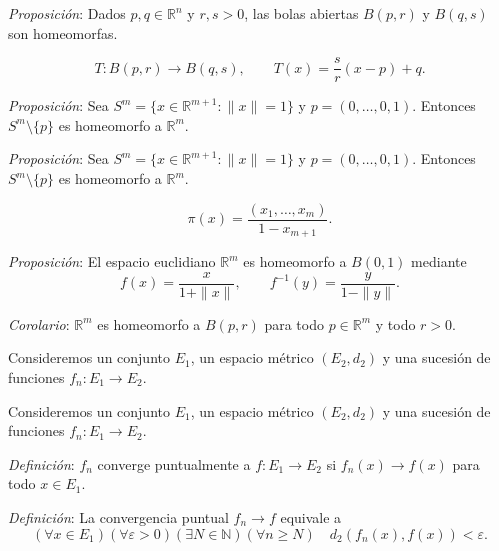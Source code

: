 \documentclass{beamer}
\begin{document}
  \begin{frame}
    \textit{Proposición}: Dados $p,q\in\mathbb{R}^n$ y $r,s>0$, las bolas abiertas $B(p,r)$ y $B(q,s)$ son homeomorfas.

    \[T:B(p,r)\to B(q,s),\qquad T(x)=\frac{s}{r}(x-p)+q.\]
  \end{frame}

  \begin{frame}
    \textit{Proposición}: Sea $S^m=\{x\in\mathbb{R}^{m+1}:\|x\|=1\}$ y $p=(0,\ldots,0,1)$. Entonces $S^m\setminus\{p\}$ es homeomorfo a $\mathbb{R}^m$.
  \end{frame}

  \begin{frame}
    \textit{Proposición}: Sea $S^m=\{x\in\mathbb{R}^{m+1}:\|x\|=1\}$ y $p=(0,\ldots,0,1)$. Entonces $S^m\setminus\{p\}$ es homeomorfo a $\mathbb{R}^m$.

    \[\pi(x)=\frac{(x_1,\ldots,x_m)}{1-x_{m+1}}.\]
  \end{frame}

  \begin{frame}
    \textit{Proposición}: El espacio euclidiano $\mathbb{R}^m$ es homeomorfo a $B(0,1)$ mediante
    \[f(x)=\frac{x}{1+\|x\|},\qquad f^{-1}(y)=\frac{y}{1-\|y\|}.\]
  \end{frame}

  \begin{frame}
    \textit{Corolario}: $\mathbb{R}^m$ es homeomorfo a $B(p,r)$ para todo $p\in\mathbb{R}^m$ y todo $r>0$.
  \end{frame}

  \begin{frame}
    Consideremos un conjunto $E_1$, un espacio métrico $(E_2,d_2)$ y una sucesión de funciones $f_n:E_1\to E_2$.
  \end{frame}

  \begin{frame}
    Consideremos un conjunto $E_1$, un espacio métrico $(E_2,d_2)$ y una sucesión de funciones $f_n:E_1\to E_2$.

    \textit{Definición}: $f_n$ converge puntualmente a $f:E_1\to E_2$ si $f_n(x)\to f(x)$ para todo $x\in E_1$.
  \end{frame}

  \begin{frame}
    \textit{Definición}: La convergencia puntual $f_n\to f$ equivale a
    \[(\forall x\in E_1)(\forall\varepsilon>0)(\exists N\in\mathbb{N})
    (\forall n\geq N)\quad d_2(f_n(x),f(x))<\varepsilon.\]
  \end{frame}
\end{document}
